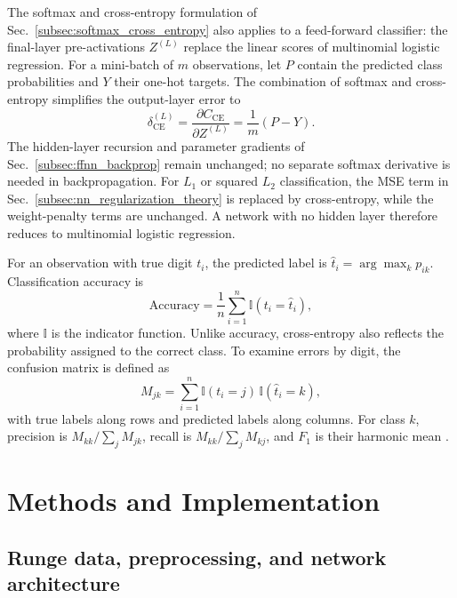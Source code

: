 \documentclass[aps,rmp,reprint,amsmath,amssymb,graphicx,longbibliography]{revtex4-1}
\begin{document}
The softmax and cross-entropy formulation of
Sec.~\ref{subsec:softmax_cross_entropy} also applies to a feed-forward
classifier: the final-layer pre-activations $Z^{(L)}$ replace the linear
scores of multinomial logistic regression. For a mini-batch of $m$
observations, let $P$ contain the predicted class probabilities and
$Y$ their one-hot targets. The combination of softmax and cross-entropy
simplifies the output-layer error to \cite{Book_Ch5,Book_Ch8}
\begin{equation}
    \delta^{(L)}_{\mathrm{CE}}
    =\frac{\partial C_{\mathrm{CE}}}{\partial Z^{(L)}}
    =\frac{1}{m}(P-Y).
    \label{eq:mnist_output_delta}
\end{equation}
The hidden-layer recursion and parameter gradients of
Sec.~\ref{subsec:ffnn_backprop} remain unchanged; no separate softmax
derivative is needed in backpropagation. For $L_1$ or squared $L_2$
classification, the MSE term in Sec.~\ref{subsec:nn_regularization_theory}
is replaced by cross-entropy, while the weight-penalty terms are unchanged.
A network with no hidden layer therefore reduces to multinomial logistic
regression.

For an observation with true digit $t_i$, the predicted label is
$\hat t_i=\arg\max_k p_{ik}$. Classification accuracy is
\begin{equation}
    \mathrm{Accuracy}=
    \frac{1}{n}\sum_{i=1}^{n}\mathbb{I}(t_i=\hat t_i),
    \label{eq:mnist_accuracy}
\end{equation}
where $\mathbb{I}$ is the indicator function. Unlike accuracy, cross-entropy
also reflects the probability assigned to the correct class. To examine
errors by digit, the confusion matrix is defined as
\begin{equation}
    M_{jk}=\sum_{i=1}^{n}
    \mathbb{I}(t_i=j)\,\mathbb{I}(\hat t_i=k),
    \label{eq:mnist_confusion}
\end{equation}
with true labels along rows and predicted labels along columns. For
class $k$, precision is $M_{kk}/\sum_j M_{jk}$, recall is
$M_{kk}/\sum_j M_{kj}$, and $F_1$ is their harmonic mean
\cite{Book_Ch5}.


\section{Methods and Implementation}

\subsection{Runge data, preprocessing, and network architecture}
\label{subsec:partb_methods}
\end{document}
